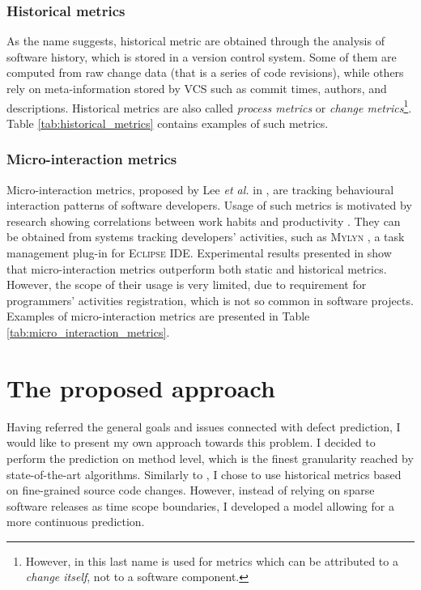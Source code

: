 \documentclass{pracamgr}
\begin{document}

\subsection{Historical metrics}
\label{sec:historical}
As the name suggests, historical metric are obtained through the analysis of software history, which is stored in a version control system. Some of them are computed from raw change data (that is a series of code revisions), while others rely on meta-information stored by VCS such as commit times, authors, and descriptions. Historical metrics are also called \emph{process metrics} or \emph{change metrics}\footnote{However, in \cite{Fukushima} this last name is used for metrics which can be attributed to a \textit{change itself}, not to a software component.}. Table \ref{tab:historical_metrics} contains examples of such metrics.


\subsection{Micro-interaction metrics}
\label{sec:micro-interaction}
Micro-interaction metrics, proposed by Lee \textit{et al.} in \cite{micro_interaction}, are tracking behavioural interaction patterns of software developers. Usage of such metrics is motivated by research showing correlations between work habits and productivity \cite{LaToza}. They can be obtained from systems tracking developers' activities, such as \textsc{Mylyn} \cite{mylyn}, a task management plug-in for \textsc{Eclipse IDE}. Experimental results presented in \cite{micro_interaction} show that micro-interaction metrics outperform both static and historical metrics. However, the scope of their usage is very limited, due to requirement for programmers' activities registration, which is not so common in software projects. Examples of micro-interaction metrics are presented in Table \ref{tab:micro_interaction_metrics}.


\chapter{The proposed approach}
\label{cha:approach}
Having referred the general goals and issues connected with defect prediction, I would like to present my own approach towards this problem. I decided to perform the prediction on method level, which is the finest granularity reached by state-of-the-art algorithms. Similarly to \cite{method-level}, I chose to use historical metrics based on fine-grained source code changes. However, instead of relying on sparse software releases as time scope boundaries, I developed a model allowing for a more continuous prediction.
\end{document}
